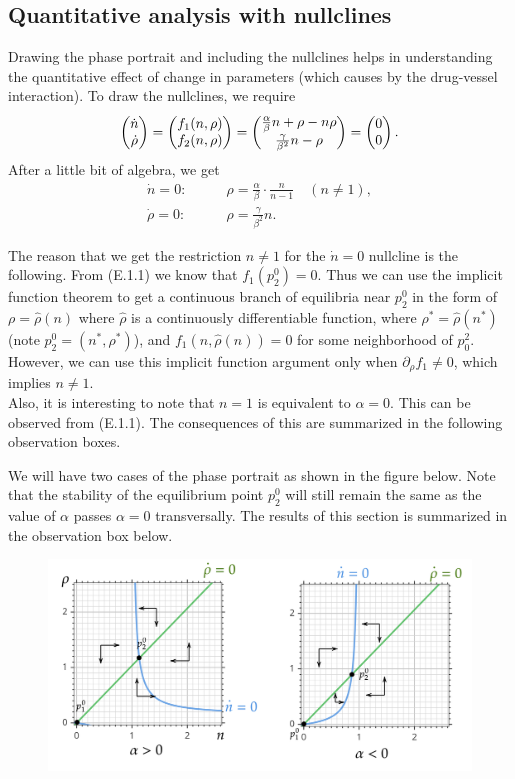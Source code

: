 \subsection*{Quantitative analysis with nullclines}
Drawing the phase portrait and including the nullclines helps in understanding the quantitative effect of change in parameters (which causes by the drug-vessel interaction). To draw the nullclines, we require
\[ \begin{pmatrix} \dot{n} \\ \dot{\rho} \end{pmatrix} = \begin{pmatrix} f_1(n,\rho) \\ f_2(n,\rho) \end{pmatrix} = \begin{pmatrix} \frac{\alpha}{\beta}n + \rho - n\rho \\ \frac{\gamma}{\beta^2}n - \rho \end{pmatrix} = \begin{pmatrix} 0 \\ 0 \end{pmatrix}. \]
After a little bit of algebra, we get
\begin{align*}
	\dot{n} = 0:& \qquad \rho = \frac{\alpha}{\beta}\cdot \frac{n}{n-1} \quad (n\neq 1),\\
	\dot{\rho} = 0:& \qquad \rho = \frac{\gamma}{\beta^2}n.
\end{align*}
\begin{observation}
	The reason that we get the restriction $n\neq 1$ for the $\dot{n} = 0$ nullcline is the following. From (E.1.1) we know that $f_1(p^0_2)=0$. Thus we can use the implicit function theorem to get a continuous branch of equilibria near $p_2^0$ in the form of $\rho = \hat{\rho}(n)$ where $\hat{\rho}$ is a continuously differentiable function, where $\rho^* = \hat{\rho}(n^*)$ (note $p^0_2 = (n^*, \rho^*)$), and $f_1(n,\hat{\rho}(n)) = 0$ for some neighborhood of $p_0^2$. However, we can use this implicit function argument only when $\partial_\rho f_1 \neq 0$, which implies $n\neq 1$.\\
	Also, it is interesting to note that $n=1$ is equivalent to $\alpha=0$. This can be observed from (E.1.1). The consequences of this are summarized in the following observation boxes.
\end{observation}

We will have two cases of the phase portrait as shown in the figure below. Note that the stability of the equilibrium point $p_2^0$ will still remain the same as the value of $\alpha$ passes $\alpha=0$ transversally. The results of this section is summarized in the observation box below.
\begin{figure}[h!]
	\centering
	\includegraphics[width=\linewidth]{images/nullClines_positiveNegative.png} %
\end{figure}

